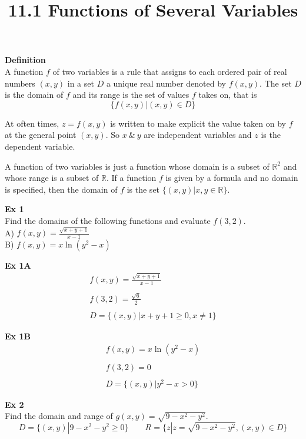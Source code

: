 \documentclass{article}
\title{11.1 Functions of Several Variables}
\begin{document}
    \maketitle
    \textbf{Definition}\\
    A function $ f $ of two variables is a rule that assigns to each ordered pair of real numbers $ (x,y) $ in a set $ D $ a unique real number denoted by $ f(x,y) $. The set $ D $ is the domain of $ f $ and its range is the set of values $ f $ takes on, that is
    \[
      \{ f(x,y) | (x,y) \in D \} 
    \]

    At often times, $ z=f(x,y) $ is written to make explicit the value taken on by $ f $ at the general point $ (x,y) $. So $ x ~\&~ y $ are independent variables and $ z $ is the dependent variable.

    A function of two variables is just a function whose domain is a subset of $ \mathbb{R}^{2}  $ and whose range is a subset of $ \mathbb{R} $. If a function $ f $ is given by a formula and no domain is specified, then the domain of $ f $ is the set $ \{ (x,y)|x,y \in \mathbb{R} \} $.

  \textbf{Ex 1}\\
  Find the domains of the following functions and evaluate $ f(3,2) $.\\
  A) $ f(x,y)=\frac{\sqrt{x+y+1}}{x-1}$\\
  B) $ f(x,y) =x\ln(y^{2}-x) $ 

  \textbf{Ex 1A}
  \[
      \begin{gathered}
      f(x,y)=\frac{\sqrt{x+y+1}}{x-1}\\
      ~\\
      f(3,2)=\frac{\sqrt{6}}{2}\\
      ~\\ 
      D=\{ (x,y) | x+y+1\ge 0,x \neq 1\}
      \end{gathered}
  \]

  \textbf{Ex 1B}
  \[
      \begin{gathered}
      f(x,y)=x\ln(y^{2}-x)\\
      ~\\
      f(3,2)=0\\
      ~\\
      D=\{ (x,y)|y^{2}-x>0\}
      \end{gathered}
  \]

  \textbf{Ex 2}\\
  Find the domain and range of $ g(x,y)=\sqrt{9-x^{2}-y^{2}}$.
  \[
      D=\{ (x,y)|9-x^{2}-y^{2}\ge0\} \qquad R=\{ z|z=\sqrt{9-x^{2} -y^{2} },(x,y) \in D \}
  \]
  
    
\end{document}

